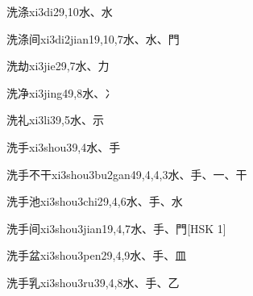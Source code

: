 \begin{entry}{洗涤}{xi3di2}{9,10}{⽔、⽔}
\end{entry}

\begin{entry}{洗涤间}{xi3di2jian1}{9,10,7}{⽔、⽔、⾨}
\end{entry}

\begin{entry}{洗劫}{xi3jie2}{9,7}{⽔、⼒}
\end{entry}

\begin{entry}{洗净}{xi3jing4}{9,8}{⽔、⼎}
\end{entry}

\begin{entry}{洗礼}{xi3li3}{9,5}{⽔、⽰}
\end{entry}

\begin{entry}{洗手}{xi3shou3}{9,4}{⽔、⼿}
\end{entry}

\begin{entry}{洗手不干}{xi3shou3bu2gan4}{9,4,4,3}{⽔、⼿、⼀、⼲}
\end{entry}

\begin{entry}{洗手池}{xi3shou3chi2}{9,4,6}{⽔、⼿、⽔}
\end{entry}

\begin{entry}{洗手间}{xi3shou3jian1}{9,4,7}{⽔、⼿、⾨}[HSK 1]
\end{entry}

\begin{entry}{洗手盆}{xi3shou3pen2}{9,4,9}{⽔、⼿、⽫}
\end{entry}

\begin{entry}{洗手乳}{xi3shou3ru3}{9,4,8}{⽔、⼿、⼄}
\end{entry}

